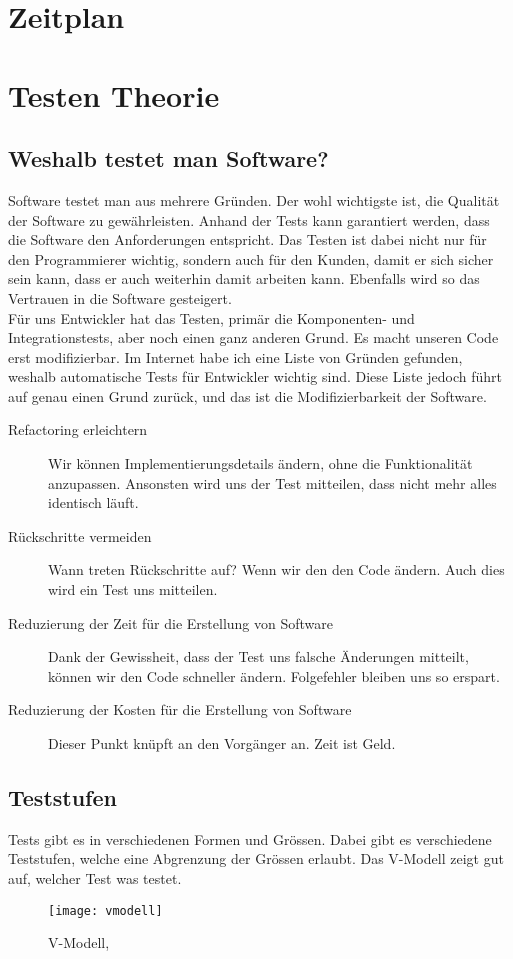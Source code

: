 \section{Zeitplan} \label{Zeitplan}

\section{Testen Theorie} \label{Testen Theorie}
\subsection{Weshalb testet man Software?}
Software testet man aus mehrere Gründen. Der wohl wichtigste ist, die Qualität der Software zu gewährleisten. Anhand der Tests kann garantiert werden, dass die Software den Anforderungen entspricht. Das Testen ist dabei nicht nur für den Programmierer wichtig, sondern auch für den Kunden, damit er sich sicher sein kann, dass er auch weiterhin damit arbeiten kann. Ebenfalls wird so das Vertrauen in die Software gesteigert. \\
Für uns Entwickler hat das Testen, primär die Komponenten- und Integrationstests, aber noch einen ganz anderen Grund. Es macht unseren Code erst modifizierbar. Im Internet habe ich eine Liste von Gründen gefunden, weshalb automatische Tests für Entwickler wichtig sind. Diese Liste jedoch führt auf genau einen Grund zurück, und das ist die Modifizierbarkeit der Software.
\begin{description}
	\item[Refactoring erleichtern] Wir können Implementierungsdetails ändern, ohne die Funktionalität anzupassen. Ansonsten wird uns der Test mitteilen, dass nicht mehr alles identisch läuft.
	\item[Rückschritte vermeiden] Wann treten Rückschritte auf? Wenn wir den den Code ändern. Auch dies wird ein Test uns mitteilen.
	\item[Reduzierung der Zeit für die Erstellung von Software] Dank der Gewissheit, dass der Test uns falsche Änderungen mitteilt, können wir den Code schneller ändern. Folgefehler bleiben uns so erspart.
	\item[Reduzierung der Kosten für die Erstellung von Software] Dieser Punkt knüpft an den Vorgänger an. Zeit ist Geld.
\end{description}

\subsection{Teststufen}
Tests gibt es in verschiedenen Formen und Grössen. Dabei gibt es verschiedene Teststufen, welche eine Abgrenzung der Grössen erlaubt. Das V-Modell zeigt gut auf, welcher Test was testet.
\begin{figure}[H]
	\centering
	\texttt{[image: vmodell]}
	\caption{V-Modell, \protect{}}
\end{figure}

